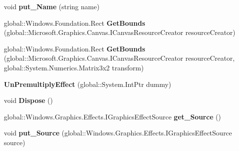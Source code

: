 \begin{DoxyCompactItemize}
void {\bfseries put\+\_\+\+Name} (string name)
\item 
\mbox{\label{class_microsoft_1_1_graphics_1_1_canvas_1_1_effects_1_1_un_premultiply_effect_a5100abdc8715c4ba995f6f6a6e0cb593}} 
global\+::\+Windows.\+Foundation.\+Rect {\bfseries Get\+Bounds} (global\+::\+Microsoft.\+Graphics.\+Canvas.\+I\+Canvas\+Resource\+Creator resource\+Creator)
\item 
\mbox{\label{class_microsoft_1_1_graphics_1_1_canvas_1_1_effects_1_1_un_premultiply_effect_a88c2619b79305957a357452b58d66be6}} 
global\+::\+Windows.\+Foundation.\+Rect {\bfseries Get\+Bounds} (global\+::\+Microsoft.\+Graphics.\+Canvas.\+I\+Canvas\+Resource\+Creator resource\+Creator, global\+::\+System.\+Numerics.\+Matrix3x2 transform)
\item 
\mbox{\label{class_microsoft_1_1_graphics_1_1_canvas_1_1_effects_1_1_un_premultiply_effect_afec8af676d2e6c2a8e095f427e8782f9}} 
{\bfseries Un\+Premultiply\+Effect} (global\+::\+System.\+Int\+Ptr dummy)
\item 
\mbox{\label{class_microsoft_1_1_graphics_1_1_canvas_1_1_effects_1_1_un_premultiply_effect_a046dc1273449b99a5005b41f3a9300ee}} 
void {\bfseries Dispose} ()
\item 
\mbox{\label{class_microsoft_1_1_graphics_1_1_canvas_1_1_effects_1_1_un_premultiply_effect_a8edd8d7c36e87f9f8d1187028b644c4f}} 
global\+::\+Windows.\+Graphics.\+Effects.\+I\+Graphics\+Effect\+Source {\bfseries get\+\_\+\+Source} ()
\item 
\mbox{\label{class_microsoft_1_1_graphics_1_1_canvas_1_1_effects_1_1_un_premultiply_effect_a20525045ca936b234efc32a3132f5562}} 
void {\bfseries put\+\_\+\+Source} (global\+::\+Windows.\+Graphics.\+Effects.\+I\+Graphics\+Effect\+Source source)
\item 
\mbox{\label{class_microsoft_1_1_graphics_1_1_canvas_1_1_effects_1_1_un_premultiply_effect_a256aeca5e043b39b008fe14fe263583b}} 

\end{DoxyCompactItemize}
